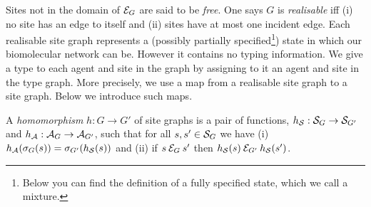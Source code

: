 Sites not in the domain of $\mathcal{E}_G$ are said to be \emph{free}.
One says $G$ is \emph{realisable} iff
(i) no site has an edge to itself and
(ii) sites have at most one incident edge.
Each realisable site graph represents a
(possibly partially specified\footnote{
  Below you can find the definition of a fully specified state,
  which we call a mixture.})
state in which our biomolecular network can be.
However it contains no typing information.
We give a type to each agent and site in the graph
by assigning to it an agent and site in the type graph.
More precisely,
we use a map from a realisable site graph to a site graph.
Below we introduce such maps.

\begin{flushleft}
\begin{minipage}{.66\linewidth}
\begin{definition}
  A \emph{homomorphism} $h: G \to G'$ of site graphs is
  a pair of functions, $h_{\mathcal{S}}: \mathcal{S}_G \to \mathcal{S}_{G'}$
  and $h_{\mathcal{A}}: \mathcal{A}_G \to \mathcal{A}_{G'}$, such that
  for all $s,s' \in \mathcal{S}_G$ we have
  (i) $h_{\mathcal{A}}(\sigma_G(s)) = \sigma_{G'}(h_{\mathcal{S}}(s))$
  and (ii) if $s \mathbin{\mathcal{E}_G} s'$ then
  $h_{\mathcal{S}}(s) \mathbin{\mathcal{E}_{G'}} h_{\mathcal{S}}(s')$.
\end{definition}
\end{minipage}
\begin{minipage}{.3\linewidth}
\begin{flushright}
\end{flushright}
\end{minipage}
\end{flushleft}

